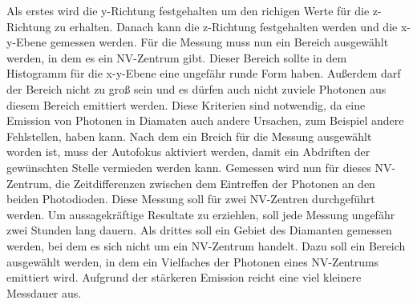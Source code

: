 Als erstes wird die y-Richtung festgehalten um den richigen Werte f\"ur die z-Richtung zu erhalten. 
Danach kann die z-Richtung festgehalten werden und die x-y-Ebene gemessen werden. 
F\"ur die Messung muss nun ein Bereich ausgew\"ahlt werden, in dem es  ein NV-Zentrum gibt.  
Dieser Bereich sollte in dem Histogramm f\"ur die x-y-Ebene eine ungef\"ahr runde Form haben. 
Au{\ss}erdem darf der Bereich nicht zu gro{\ss} sein und es d\"urfen auch nicht zuviele Photonen aus diesem Bereich emittiert werden. 
Diese Kriterien sind notwendig, da eine Emission von Photonen in Diamaten auch andere Ursachen, zum Beispiel andere Fehlstellen, haben kann. 
Nach dem ein Breich f\"ur die Messung ausgew\"ahlt worden ist, muss der Autofokus aktiviert werden, damit ein Abdriften der gew\"unschten Stelle vermieden werden kann. Gemessen wird nun f\"ur dieses NV-Zentrum, die Zeitdifferenzen zwischen dem Eintreffen der Photonen an den beiden Photodioden. 
Diese Messung soll f\"ur zwei NV-Zentren durchgef\"uhrt werden. 
Um aussagekr\"aftige Resultate zu erziehlen, soll jede Messung ungef\"ahr zwei Stunden lang dauern. 
Als drittes soll ein Gebiet des Diamanten gemessen werden, bei dem es sich nicht um ein NV-Zentrum handelt. 
Dazu soll ein Bereich ausgew\"ahlt werden, in dem ein Vielfaches der Photonen eines NV-Zentrums emittiert wird. Aufgrund der stärkeren Emission reicht eine viel kleinere Messdauer aus. 


